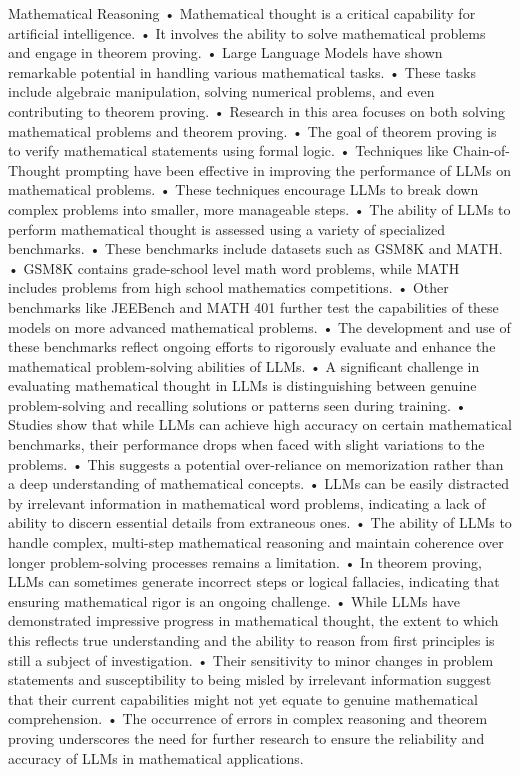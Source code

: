 \begin{frame}{Mathematical Reasoning}
	•	Mathematical thought is a critical capability for artificial intelligence.
	•	It involves the ability to solve mathematical problems and engage in theorem proving.
	•	Large Language Models have shown remarkable potential in handling various mathematical tasks.
	•	These tasks include algebraic manipulation, solving numerical problems, and even contributing to theorem proving.
	•	Research in this area focuses on both solving mathematical problems and theorem proving.
	•	The goal of theorem proving is to verify mathematical statements using formal logic.
	•	Techniques like Chain-of-Thought prompting have been effective in improving the performance of LLMs on mathematical problems.
	•	These techniques encourage LLMs to break down complex problems into smaller, more manageable steps.
	•	The ability of LLMs to perform mathematical thought is assessed using a variety of specialized benchmarks.
	•	These benchmarks include datasets such as GSM8K and MATH.
	•	GSM8K contains grade-school level math word problems, while MATH includes problems from high school mathematics competitions.
	•	Other benchmarks like JEEBench and MATH 401 further test the capabilities of these models on more advanced mathematical problems.
	•	The development and use of these benchmarks reflect ongoing efforts to rigorously evaluate and enhance the mathematical problem-solving abilities of LLMs.
	•	A significant challenge in evaluating mathematical thought in LLMs is distinguishing between genuine problem-solving and recalling solutions or patterns seen during training.
	•	Studies show that while LLMs can achieve high accuracy on certain mathematical benchmarks, their performance drops when faced with slight variations to the problems.
	•	This suggests a potential over-reliance on memorization rather than a deep understanding of mathematical concepts.
	•	LLMs can be easily distracted by irrelevant information in mathematical word problems, indicating a lack of ability to discern essential details from extraneous ones.
	•	The ability of LLMs to handle complex, multi-step mathematical reasoning and maintain coherence over longer problem-solving processes remains a limitation.
	•	In theorem proving, LLMs can sometimes generate incorrect steps or logical fallacies, indicating that ensuring mathematical rigor is an ongoing challenge.
	•	While LLMs have demonstrated impressive progress in mathematical thought, the extent to which this reflects true understanding and the ability to reason from first principles is still a subject of investigation.
	•	Their sensitivity to minor changes in problem statements and susceptibility to being misled by irrelevant information suggest that their current capabilities might not yet equate to genuine mathematical comprehension.
	•	The occurrence of errors in complex reasoning and theorem proving underscores the need for further research to ensure the reliability and accuracy of LLMs in mathematical applications.

\end{frame}